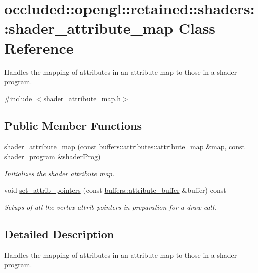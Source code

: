 \hypertarget{classoccluded_1_1opengl_1_1retained_1_1shaders_1_1shader__attribute__map}{\section{occluded\+:\+:opengl\+:\+:retained\+:\+:shaders\+:\+:shader\+\_\+attribute\+\_\+map Class Reference}
\label{classoccluded_1_1opengl_1_1retained_1_1shaders_1_1shader__attribute__map}
}


Handles the mapping of attributes in an attribute map to those in a shader program.  




{\ttfamily \#include $<$shader\+\_\+attribute\+\_\+map.\+h$>$}

\subsection*{Public Member Functions}
\begin{DoxyCompactItemize}
\item 
\hyperlink{classoccluded_1_1opengl_1_1retained_1_1shaders_1_1shader__attribute__map_a317ce382cc4aabad2ba440a2bc0ab745}{shader\+\_\+attribute\+\_\+map} (const \hyperlink{classoccluded_1_1buffers_1_1attributes_1_1attribute__map}{buffers\+::attributes\+::attribute\+\_\+map} \&map, const \hyperlink{classoccluded_1_1opengl_1_1retained_1_1shaders_1_1shader__program}{shader\+\_\+program} \&shader\+Prog)
\begin{DoxyCompactList}\small\item\em Initializes the shader attribute map. \end{DoxyCompactList}\item 
void \hyperlink{classoccluded_1_1opengl_1_1retained_1_1shaders_1_1shader__attribute__map_a913681eba3098eae202cc8aee51fdb71}{set\+\_\+attrib\+\_\+pointers} (const \hyperlink{classoccluded_1_1buffers_1_1attribute__buffer}{buffers\+::attribute\+\_\+buffer} \&buffer) const 
\begin{DoxyCompactList}\small\item\em Setups of all the vertex attrib pointers in preparation for a draw call. \end{DoxyCompactList}\end{DoxyCompactItemize}


\subsection{Detailed Description}
Handles the mapping of attributes in an attribute map to those in a shader program. 

